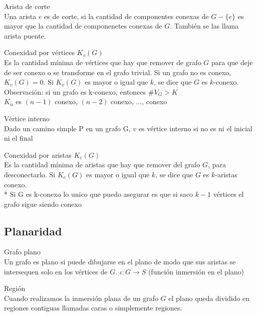 \documentclass{article}
\begin{document}
\begin{defn}
Arista de corte\\ Una arista $e$ es de corte, si la cantidad de componentes conexas de $G-\{e\}$ es mayor que la cantidad de componenetes conexas de $G$. También se las llama arista puente.
\end{defn}

\begin{defn}
Conexidad por vértices $K_{v}(G)$ \\ Es la cantidad mínima de vértices que hay que remover de grafo $G$ para que deje de ser conexo o se transforme en el grafo trivial. Si un grafo no es conexo, $K_{v}(G)=0 .$ Si $K_{v}(G)$ es mayor o igual que $k$,
se dice que $G$ es $k$-conexo. \\
Observación: si un grafo es k-conexo, entonces $\# V_{G}>K$ \\
$K_n$ es $(n-1)$ conexo, $(n-2)$ conexo, $\dots$, conexo
\end{defn}

\begin{defn}
Vértice interno\\ Dado un camino simple P en un grafo G, $v$ es vértice interno si no es ni el inicial ni el final
\end{defn}

\begin{defn}
Conexidad por aristas $K_{e}(G)$ \\ Es la cantidad mínima de aristas que hay que remover del grafo $G$, para desconectarlo. Si $K_{e}(G)$ es mayor o igual que $k$, se dice que $G$ es $k$-aristas conexo. \\*
Si G es k-conexo lo unico que puedo asegurar es que si saco $k-1$ vértices el grafo sigue siendo conexo
\end{defn}

\subsection{Planaridad}

\begin{defn}
Grafo plano \\ Un grafo es plano si puede dibujarse en el plano de modo que sus aristas se intersequen solo en los vértices de $G$. $\iota: G \rightarrow S$ (función inmersión en el plano)
\end{defn}

\begin{defn}
Región \\ Cuando realizamos la inmersión plana de un grafo $G$ el plano queda dividido en regiones contiguas llamadas caras o simplemente regiones.
\end{defn}
\end{document}
